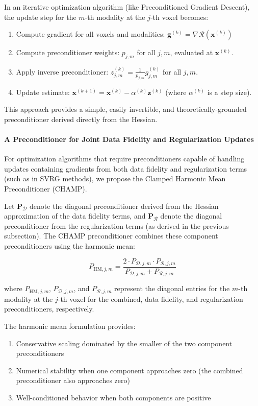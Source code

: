 In an iterative optimization algorithm (like Preconditioned Gradient Descent), the update step for the $m$-th modality at the $j$-th voxel becomes:
\begin{enumerate}
    \item Compute gradient for all voxels and modalities: $\mathbf{g}^{(k)}= \nabla \mathcal{R}(\mathbf{x}^{(k)})$
    \item Compute preconditioner weights: $p_{j,m}$ for all $j, m$, evaluated at $\mathbf{x}^{(k)}$.
    \item Apply inverse preconditioner: $z^{(k)}_{j,m} = \frac{1}{p_{j,m}} g_{j,m}^{(k)}$ for all $j,m$.
    \item Update estimate: $\mathbf{x}^{(k+1)} = \mathbf{x}^{(k)} - \alpha^{(k)} \mathbf{z}^{(k)}$ (where $\alpha^{(k)}$ is a step size).
\end{enumerate}
This approach provides a simple, easily invertible, and theoretically-grounded preconditioner derived directly from the Hessian.

\paragraph{A Preconditioner for Joint Data Fidelity and Regularization Updates}

For optimization algorithms that require preconditioners capable of handling updates containing gradients from both data fidelity and regularization terms (such as in SVRG methods), we propose the Clamped Harmonic Mean Preconditioner (CHAMP). 

Let $\mathbf{P}_{\mathcal{D}}$ denote the diagonal preconditioner derived from the Hessian approximation of the data fidelity terms, and $\mathbf{P}_{\mathcal{R}}$ denote the diagonal preconditioner from the regularization terms (as derived in the previous subsection). The CHAMP preconditioner combines these component preconditioners using the harmonic mean:

\[
    P_{\text{HM},j,m} = \frac{2 \cdot P_{\mathcal{D},j,m} \cdot P_{\mathcal{R},j,m}}{P_{\mathcal{D},j,m} + P_{\mathcal{R},j,m}}
\]

where $P_{\text{HM},j,m}$, $P_{\mathcal{D},j,m}$, and $P_{\mathcal{R},j,m}$ represent the diagonal entries for the $m$-th modality at the $j$-th voxel for the combined, data fidelity, and regularization preconditioners, respectively.

The harmonic mean formulation provides:
\begin{enumerate}
    \item Conservative scaling dominated by the smaller of the two component preconditioners
    \item Numerical stability when one component approaches zero (the combined preconditioner also approaches zero)
    \item Well-conditioned behavior when both components are positive
\end{enumerate}

